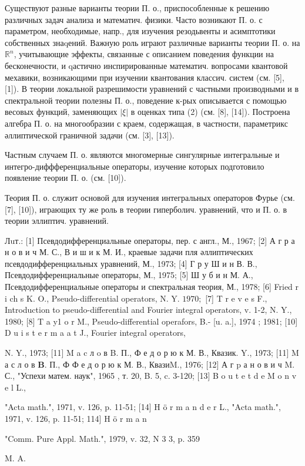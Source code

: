 \documentclass[10pt]{article}
\begin{document}
Существуют разные варианты теории П. о., приспособленные к решению различных задач анализа и математич. физики. Часто возникают П. о. с параметром, необходимые, напр., для изучения резодьвенты и асимптотики собственных знаqений. Важную роль играют различные варианты теории П. о. на $\mathbb{R}^{n}$, учитывающие эффекты, связанные с описанием поведения функции на бесконечности, и qастично инспирированные математич. вопросами квантовой мехавики, возникающими при изучении квантования классич. систем (см. [5], [1]). В теории локальной разрешимости уравнений с частными производными и в спектральной теории полезны П. о., поведение к-рых описывается с помощью весовых функций, заменяющих $|\xi|$ в оценках типа (2) (см. [8], [14]). Построена алгебра П. о. на многообразии с краем, содержащая, в частности, параметрикс әллиптической граничной задачи (см. [3], [13]).



Частным случаем П. о. являются многомерные сингулярные интегральные и интегро-диффференциальные операторы, изучение которых подготовило появление теории П. о. (см. [10]).



Теория П. о. служит основой для изучения интегральных операторов Фурье (см. [7], [10]), играющих ту же роль в теории гиперболич. уравнений, что и П. о. в теории эллиптич. уравнений.



Лuт.: [1] Псевдодифференциальные операторы, пер. с англ., М., 1967; [2] А г р а н о в и ч М. С., В и ш и к М. И., краевые задачи пля әллиптических псевдодифференциальных уравнений, М., 1973; [4] Г р у Ш и н В. В., Псевдодифференциальные операторы, М., 1975; [5] Ш у б и н М. А., Псевдодифференциальные операторы и спектральная теория, М., 1978; [6] Fried r i ch s K. O., Pseudo-differential operators, N. Y. $1970 ;$ [7] T r e v e s F., Introduction to pseudo-differential and Fourier integral operators, v. 1-2, N. Y., 1980; [8] T a y1 o r M., Pseudo-differential operafors, B.- [u. a.], 1974 ; 1981; [10] D u i s t e r m a a t J., Fourier integral operators,

N. Y., 1973; [11] M a c л o в B. П., Ф е д о р ю к М. В., Квазик. Y., 1973; [11] M а с л о в $\mathbf{B}$. П., Ф Ф е д о р ю к М. В., КвазиM., 1976; [12] А г p а н о в и ч M. С., "Успехи матем. наук", 1965 , т. 20, B. 5, c. 3-120; [13] B o u t e t d e M o n v e l L.,

"Acta math.", 1971, v. 126, p. 11-51; [14] H ö r m a n d e r L., "Acta math.", 1971, v. 126, p. 11-51; 114] H ö r m a n

"Comm. Pure Appl. Math.", 1979, v. 32, N 3 3, p. 359

M. A.
\end{document}
